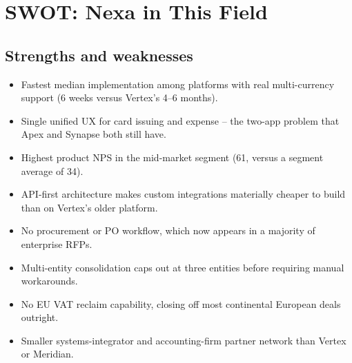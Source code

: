 \section{SWOT: Nexa in This Field}

\subsection{Strengths and weaknesses}

\begin{minipage}[t]{0.485\linewidth}
\begin{tcolorbox}[swotS, title={\faThumbsUp\ Strengths}]
\begin{itemize}[leftmargin=1.2em, itemsep=2pt]
  \item Fastest median implementation among platforms with real multi-currency support (6 weeks
    versus Vertex's 4--6 months).
  \item Single unified UX for card issuing and expense -- the two-app problem that Apex and
    Synapse both still have.
  \item Highest product NPS in the mid-market segment (61, versus a segment average of 34).
  \item API-first architecture makes custom integrations materially cheaper to build than on
    Vertex's older platform.
\end{itemize}
\end{tcolorbox}
\end{minipage}\hfill
\begin{minipage}[t]{0.485\linewidth}
\begin{tcolorbox}[swotW, title={\faThumbsDown\ Weaknesses}]
\begin{itemize}[leftmargin=1.2em, itemsep=2pt]
  \item No procurement or PO workflow, which now appears in a majority of enterprise RFPs.
  \item Multi-entity consolidation caps out at three entities before requiring manual workarounds.
  \item No EU VAT reclaim capability, closing off most continental European deals outright.
  \item Smaller systems-integrator and accounting-firm partner network than Vertex or Meridian.
\end{itemize}
\end{tcolorbox}
\end{minipage}
\par
\vspace{6pt}

